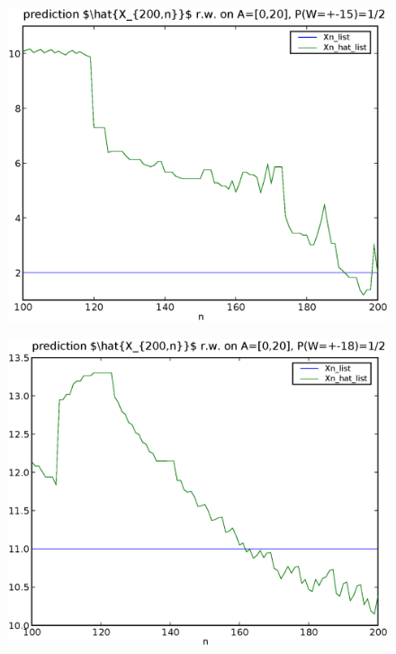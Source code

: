 \documentclass[a4paper,10pt]{article}
\begin{document}
\begin{figure}
\includegraphics[width=1\textwidth]{hw6_1_b_K_20_L_15_T_200.eps}
\caption{}\label{f6}
\end{figure}

\begin{figure}
\includegraphics[width=1\textwidth]{hw6_1_b_K_20_L_18_T_200.eps}
\caption{}\label{f7}
\end{figure}
\end{document}
